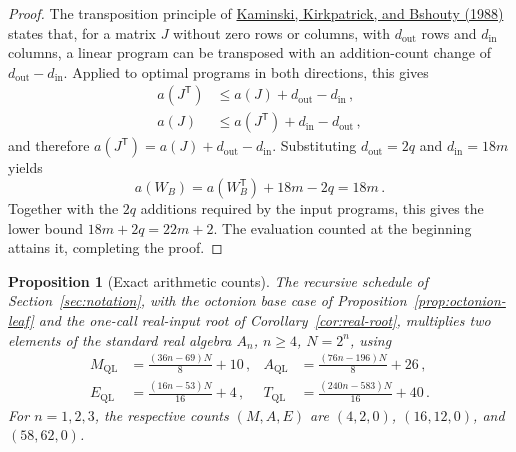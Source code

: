 \documentclass[11pt,reqno]{amsart}
\numberwithin{equation}{section}
\newtheorem{proposition}{Proposition}[section]
\begin{document}
\begin{proof}
The transposition principle of
\href{https://doi.org/10.1016/0196-6774(88)90026-0}{Kaminski, Kirkpatrick,
and Bshouty (1988)} states that, for a matrix $J$ without zero rows or
columns, with $d_{\mathrm{out}}$ rows and $d_{\mathrm{in}}$ columns, a
linear program can be transposed with an addition-count change of
$d_{\mathrm{out}}-d_{\mathrm{in}}$. Applied to optimal programs in both
directions, this gives
\[
\begin{aligned}
a(J^{\mathsf T})&\le a(J)+d_{\mathrm{out}}-d_{\mathrm{in}}\,,\\
a(J)&\le a(J^{\mathsf T})+d_{\mathrm{in}}-d_{\mathrm{out}}\,,
\end{aligned}
\]
and therefore $a(J^{\mathsf T})=a(J)+d_{\mathrm{out}}-d_{\mathrm{in}}$.
Substituting $d_{\mathrm{out}}=2q$ and $d_{\mathrm{in}}=18m$ yields
\[
a(W_B)=a(W_B^{\mathsf T})+18m-2q=18m\,.
\]
Together with the $2q$ additions required by the input programs, this
gives the lower bound $18m+2q=22m+2$. The evaluation counted at the
beginning attains it, completing the proof.
\end{proof}

\begin{proposition}[Exact arithmetic counts]\label{prop:exact-counts}
The recursive schedule of Section~\ref{sec:notation}, with the octonion base
case of
Proposition~\ref{prop:octonion-leaf} and the one-call real-input root of
Corollary~\ref{cor:real-root}, multiplies two elements of the standard
real algebra $A_n$, $n\ge4$, $N=2^n$, using
\begin{equation}\label{eq:ql-arithmetic-counts}
\begin{aligned}
M_{\mathrm{QL}}&=\frac{(36n-69)N}{8}+10\,,
&A_{\mathrm{QL}}&=\frac{(76n-196)N}{8}+26\,,\\
E_{\mathrm{QL}}&=\frac{(16n-53)N}{16}+4\,,
&T_{\mathrm{QL}}&=\frac{(240n-583)N}{16}+40\,.
\end{aligned}
\end{equation}
For $n=1,2,3$, the respective counts $(M,A,E)$ are $(4,2,0)$,
$(16,12,0)$, and $(58,62,0)$.
\end{proposition}
\end{document}
